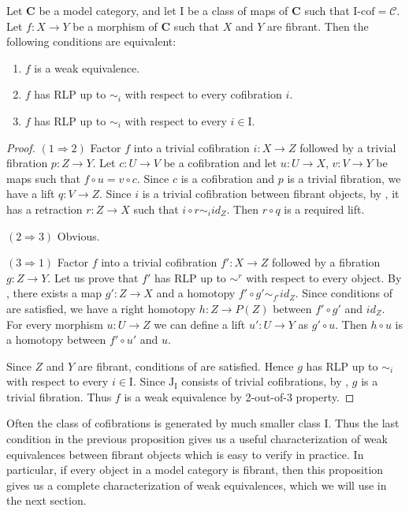 \documentclass{amsart}
\theoremstyle{definition}
\newcommand{\cof}{\mathcal{C}}
\newcommand{\cat}[1]{\mathbf{#1}}
\newcommand{\C}{\cat{C}}
\newcommand{\I}{\mathrm{I}}
\newcommand{\J}{\mathrm{J}}
\newcommand{\class}[2]{#1\text{-}\mathrm{#2}}
\newcommand{\Icof}[1][\I]{\class{#1}{cof}}
\begin{document}
\begin{prop}[min-we]
Let $\C$ be a model category, and let $\I$ be a class of maps of $\C$ such that $\Icof = \cof$.
Let $f : X \to Y$ be a morphism of $\C$ such that $X$ and $Y$ are fibrant.
Then the following conditions are equivalent:
\begin{enumerate}
\item $f$ is a weak equivalence.
\item $f$ has RLP up to $\sim_i$ with respect to every cofibration $i$.
\item $f$ has RLP up to $\sim_i$ with respect to every $i \in \I$.
\end{enumerate}
\end{prop}
\begin{proof}
$(1 \Rightarrow 2)$
Factor $f$ into a trivial cofibration $i : X \to Z$ followed by a trivial fibration $p : Z \to Y$.
Let $c : U \to V$ be a cofibration and let $u : U \to X$, $v : V \to Y$ be maps such that $f \circ u = v \circ c$.
Since $c$ is a cofibration and $p$ is a trivial fibration, we have a lift $q : V \to Z$.
Since $i$ is a trivial cofibration between fibrant objects, by , it has a retraction $r : Z \to X$ such that $i \circ r \sim_i id_Z$.
Then $r \circ q$ is a required lift.

$(2 \Rightarrow 3)$ Obvious.

$(3 \Rightarrow 1)$
Factor $f$ into a trivial cofibration $f' : X \to Z$ followed by a fibration $g : Z \to Y$.
Let us prove that $f'$ has RLP up to $\sim^r$ with respect to every object.
By , there exists a map $g' : Z \to X$ and a homotopy $f' \circ g' \sim_{f'} id_Z$.
Since conditions of  are satisfied, we have a right homotopy $h : Z \to P(Z)$ between $f' \circ g'$ and $id_Z$.
For every morphism $u : U \to Z$ we can define a lift $u' : U \to Y$ as $g' \circ u$.
Then $h \circ u$ is a homotopy between $f' \circ u'$ and $u$.

Since $Z$ and $Y$ are fibrant, conditions of  are satisfied.
Hence $g$ has RLP up to $\sim_i$ with respect to every $i \in \I$.
Since $\J_\I$ consists of trivial cofibrations, by , $g$ is a trivial fibration.
Thus $f$ is a weak equivalence by 2-out-of-3 property.
\end{proof}

Often the class of cofibrations is generated by much smaller class $\I$.
Thus the last condition in the previous proposition gives us a useful characterization of weak equivalences between fibrant objects which is easy to verify in practice.
In particular, if every object in a model category is fibrant, then this proposition gives us a complete characterization of weak equivalences, which we will use in the next section.
\end{document}
